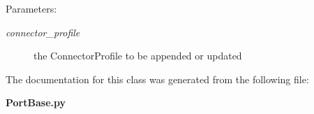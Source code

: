\begin{Desc}
\item[Parameters:]
\begin{description}
\item[{\em connector\_\-profile}]the Connector\-Profile to be appended or updated\end{description}
\end{Desc}


The documentation for this class was generated from the following file:\begin{CompactItemize}
\item 
{\bf Port\-Base.py}\end{CompactItemize}
